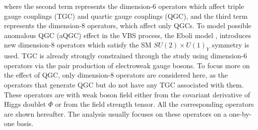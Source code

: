 where the second term represents the dimension-6 operators which affect triple gauge couplings (TGC) and quartic gauge couplings (QGC), and the third term represents the dimension-8 operators, which affect only QGCs.
To model possible anomalous QGC (aQGC) effect in the VBS process, the Eboli model \cite{eboli2006p}, introduces new dimension-8 operators which satisfy the SM $SU(2)\times U(1)_Y$ symmetry is used. TGC is already strongly constrained through the study using dimension-6 operators via the pair production of electroweak gauge bosons. To focus more on the effect of QGC, only dimension-8 operators are considered here, as the operators that generate QGC but do not have any TGC associated with them.
These operators are with weak boson field either from the covariant derivative of Higgs doublet $\Phi$ or from the field strength tensor. 
All the corresponding operators are shown hereafter. The analysis usually focuses on these operators on a one-by-one basis.
